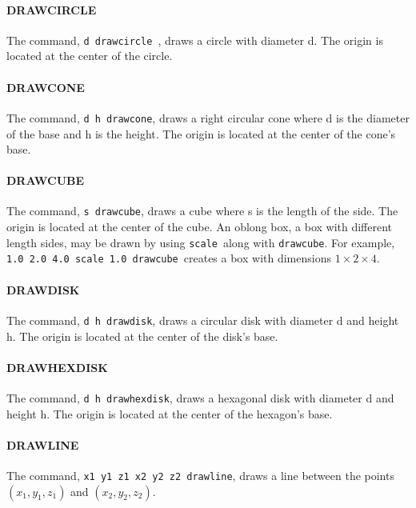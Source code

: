 \documentclass[11pt,twoside]{book}
\begin{document}
\paragraph{DRAWCIRCLE} The command, {\tt d drawcircle },
draws a circle with diameter d.  The origin is located at the center of the circle.

\paragraph{DRAWCONE}
The command, {\tt d h drawcone}, draws a right circular cone where
d is the diameter of the base and h is the height. The origin is
located at the center of the cone's base.

\paragraph{DRAWCUBE} The command, {\tt s drawcube},
draws a cube where s is the length of the side.  The origin is
located at the center of the cube.  An oblong box, a box with
different length sides, may be drawn by using {\tt scale}\ along
with {\tt drawcube}.  For example, {\tt 1.0 2.0 4.0 scale 1.0
drawcube}\ creates a box with dimensions $1\times 2\times 4$.

\paragraph{DRAWDISK} The command, {\tt d h drawdisk},
draws a circular disk with diameter d and height h. The origin is
located at the center of the disk's base.\vspace{0.25in}

\paragraph{DRAWHEXDISK} The command, {\tt d h drawhexdisk},
draws a hexagonal disk with diameter d and height h.  The origin
is located at the center of the hexagon's base.

\paragraph{DRAWLINE} The
command, {\tt x1 y1 z1 x2 y2 z2 drawline}, draws a line between
the points $(x_1,y_1,z_1)$ and $(x_2,y_2,z_2)$.\vspace{0.25in}
\end{document}
